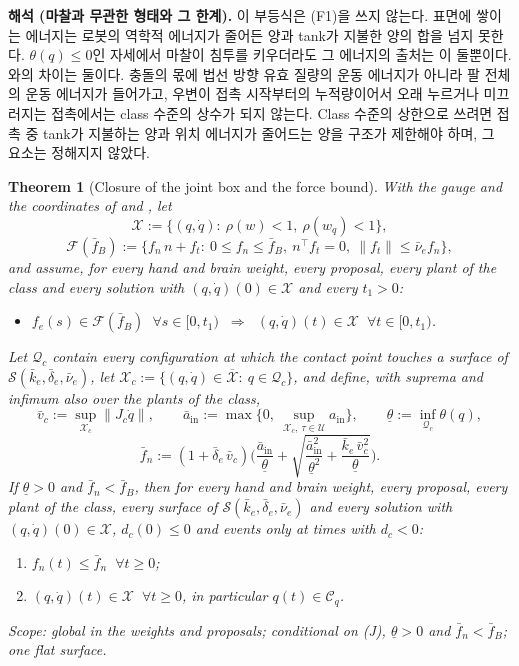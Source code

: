 \documentclass[11pt]{article}\usepackage[margin=1in]{geometry}\usepackage{amsmath,amssymb,amsthm,mathtools}\usepackage{graphicx}\graphicspath{{figures/}{../figures/}{figs/}{./}}\usepackage{enumitem}\usepackage{hyperref}\usepackage{cleveref}\usepackage{tikz}\usetikzlibrary{arrows.meta,positioning,calc,shapes.geometric}\usepackage{float}\usepackage{rotating}\usepackage[most]{tcolorbox}\usepackage{kotex}\usepackage{booktabs}\usepackage{longtable}\emergencystretch=1.6em\tolerance=2000 \crefname{assumption}{Assumption}{Assumptions}\Crefname{assumption}{Assumption}{Assumptions}\crefname{definition}{Definition}{Definitions}\Crefname{definition}{Definition}{Definitions}\crefname{proposition}{Proposition}{Propositions}\Crefname{proposition}{Proposition}{Propositions}\crefname{fact}{Fact}{Facts}\Crefname{fact}{Fact}{Facts} \newtheorem{assumption}{Assumption}\newtheorem{definition}{Definition}\newtheorem{lemma}{Lemma}\newtheorem{proposition}{Proposition}\newtheorem{theorem}{Theorem}\newtheorem{corollary}{Corollary}\newtheorem{fact}{Fact}\theoremstyle{remark}\newtheorem{remark}{Remark} \newcommand{\R}{\mathbb{R}}\newcommand{\xb}{\bar x}\newcommand{\Ab}{\bar A}\newcommand{\By}{\bar B_y}\newcommand{\U}{\mathcal U}\newcommand{\Z}{\mathcal Z}
\begin{document}
\textbf{해석 (마찰과 무관한 형태와 그 한계).} 이 부등식은 (F1)을 쓰지 않는다. 표면에 쌓이는 에너지는 로봇의 역학적 에너지가 줄어든 양과 tank가 지불한 양의 합을 넘지 못한다. $\theta(q)\le0$인 자세에서 마찰이 침투를 키우더라도 그 에너지의 출처는 이 둘뿐이다. 와의 차이는 둘이다. 충돌의 몫에 법선 방향 유효 질량의 운동 에너지가 아니라 팔 전체의 운동 에너지가 들어가고, 우변이 접촉 시작부터의 누적량이어서 오래 누르거나 미끄러지는 접촉에서는 class 수준의 상수가 되지 않는다. Class 수준의 상한으로 쓰려면 접촉 중 tank가 지불하는 양과 위치 에너지가 줄어드는 양을 구조가 제한해야 하며, 그 요소는 정해지지 않았다.

\begin{theorem}[Closure of the joint box and the force bound]
\label{thm:closure}
With the gauge and the coordinates of  and , let
\[
\mathcal X:=\{(q,\dot q):\ \rho(w)<1,\ \rho(w_q)<1\},
\]
\[
\mathcal F(\bar f_B):=\{f_n\,n+f_t:\ 0\le f_n\le\bar f_B,\ n^\top f_t=0,\ \|f_t\|\le\bar\nu_ef_n\},
\]
and assume, for every hand and brain weight, every proposal, every plant of the class and every solution with $(q,\dot q)(0)\in\mathcal X$ and every $t_1>0$:
\begin{itemize}
\item[\textbf{(J)}] $f_e(s)\in\mathcal F(\bar f_B)$ $\ \forall s\in[0,t_1)$ $\ \Longrightarrow\ $ $(q,\dot q)(t)\in\mathcal X$ $\ \forall t\in[0,t_1)$.
\end{itemize}
Let $\mathcal Q_c$ contain every configuration at which the contact point touches a surface of $\mathcal S(\bar k_e,\bar\delta_e,\bar\nu_e)$, let $\mathcal X_c:=\{(q,\dot q)\in\overline{\mathcal X}:\ q\in\mathcal Q_c\}$, and define, with suprema and infimum also over the plants of the class,
\[
\bar v_c:=\sup_{\mathcal X_c}\|J_c\dot q\|,\qquad \bar a_{\mathrm{in}}:=\max\Big\{0,\ \sup_{\mathcal X_c,\ \tau\in\U}a_{\mathrm{in}}\Big\},\qquad \underline\theta:=\inf_{\mathcal Q_c}\theta(q),
\]
\[
\bar f_n:=(1+\bar\delta_e\,\bar v_c)\Big(\frac{\bar a_{\mathrm{in}}}{\underline\theta}+\sqrt{\frac{\bar a_{\mathrm{in}}^2}{\underline\theta^2}+\frac{\bar k_e\,\bar v_c^2}{\underline\theta}}\Big) .
\]
If $\underline\theta>0$ and $\bar f_n<\bar f_B$, then for every hand and brain weight, every proposal, every plant of the class, every surface of $\mathcal S(\bar k_e,\bar\delta_e,\bar\nu_e)$ and every solution with $(q,\dot q)(0)\in\mathcal X$, $d_c(0)\le0$ and events only at times with $d_c<0$:
\begin{enumerate}[label=(\alph*)]
\item $f_n(t)\le\bar f_n$ $\ \forall t\ge0$;
\item $(q,\dot q)(t)\in\mathcal X$ $\ \forall t\ge0$, in particular $q(t)\in\mathcal C_q$.
\end{enumerate}
Scope: global in the weights and proposals; conditional on (J), $\underline\theta>0$ and $\bar f_n<\bar f_B$; one flat surface.
\end{theorem}
\end{document}
